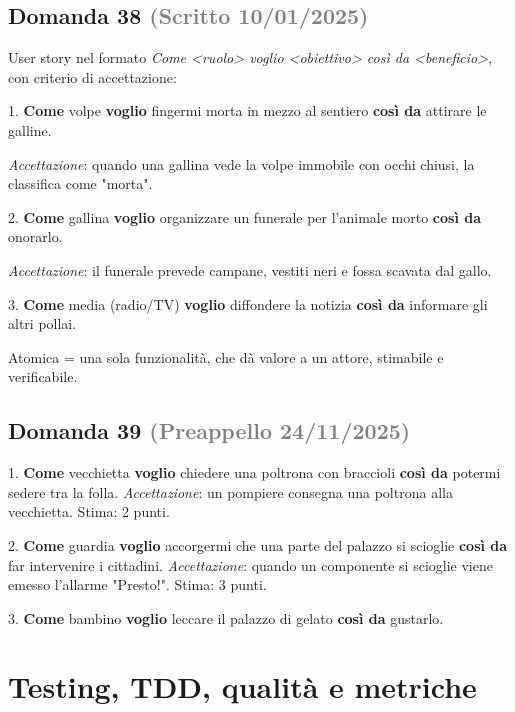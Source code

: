 \documentclass[a4paper,11pt]{article}
\begin{document}
\subsection*{Domanda 38 \hfill {\small \textcolor{gray}{(Scritto 10/01/2025)}}}
User story nel formato \textit{Come \textless{}ruolo\textgreater{} voglio \textless{}obiettivo\textgreater{} così da \textless{}beneficio\textgreater{}}, con criterio di accettazione:

1. \textbf{Come} volpe \textbf{voglio} fingermi morta in mezzo al sentiero \textbf{così da} attirare le galline.

   \textit{Accettazione}: quando una gallina vede la volpe immobile con occhi chiusi, la classifica come "morta".

2. \textbf{Come} gallina \textbf{voglio} organizzare un funerale per l'animale morto \textbf{così da} onorarlo.

   \textit{Accettazione}: il funerale prevede campane, vestiti neri e fossa scavata dal gallo.

3. \textbf{Come} media (radio/TV) \textbf{voglio} diffondere la notizia \textbf{così da} informare gli altri pollai.

Atomica = una sola funzionalità, che dà valore a un attore, stimabile e verificabile.



\subsection*{Domanda 39 \hfill {\small \textcolor{gray}{(Preappello 24/11/2025)}}}
1. \textbf{Come} vecchietta \textbf{voglio} chiedere una poltrona con braccioli \textbf{così da} potermi sedere tra la folla. \textit{Accettazione}: un pompiere consegna una poltrona alla vecchietta. Stima: 2 punti.

2. \textbf{Come} guardia \textbf{voglio} accorgermi che una parte del palazzo si scioglie \textbf{così da} far intervenire i cittadini. \textit{Accettazione}: quando un componente si scioglie viene emesso l'allarme "Presto!". Stima: 3 punti.

3. \textbf{Come} bambino \textbf{voglio} leccare il palazzo di gelato \textbf{così da} gustarlo.



\section{Testing, TDD, qualità e metriche}
\end{document}
